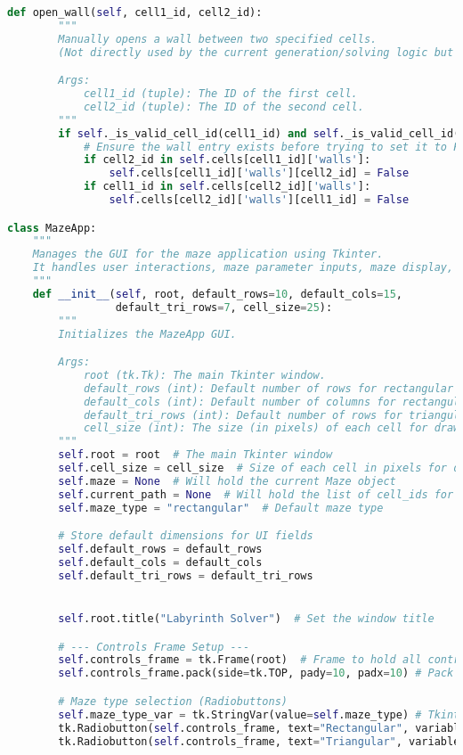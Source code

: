 \documentclass[UTF8]{report}
\theoremstyle{MyLineTheoremStyle} %
\theoremstyle{MyBlockTheoremStyle} %
\theoremstyle{MySubsubsectionStyle} %
\begin{document}
\begin{lstlisting}[language=Python, caption={迷宫生成与求解程序代码}]
    def open_wall(self, cell1_id, cell2_id):
        """
        Manually opens a wall between two specified cells.
        (Not directly used by the current generation/solving logic but can be a utility).

        Args:
            cell1_id (tuple): The ID of the first cell.
            cell2_id (tuple): The ID of the second cell.
        """
        if self._is_valid_cell_id(cell1_id) and self._is_valid_cell_id(cell2_id):
            # Ensure the wall entry exists before trying to set it to False
            if cell2_id in self.cells[cell1_id]['walls']:
                self.cells[cell1_id]['walls'][cell2_id] = False
            if cell1_id in self.cells[cell2_id]['walls']: 
                self.cells[cell2_id]['walls'][cell1_id] = False

class MazeApp:
    """
    Manages the GUI for the maze application using Tkinter.
    It handles user interactions, maze parameter inputs, maze display, and path visualization.
    """
    def __init__(self, root, default_rows=10, default_cols=15, 
                 default_tri_rows=7, cell_size=25): 
        """
        Initializes the MazeApp GUI.

        Args:
            root (tk.Tk): The main Tkinter window.
            default_rows (int): Default number of rows for rectangular mazes.
            default_cols (int): Default number of columns for rectangular mazes.
            default_tri_rows (int): Default number of rows for triangular mazes.
            cell_size (int): The size (in pixels) of each cell for drawing.
        """
        self.root = root  # The main Tkinter window
        self.cell_size = cell_size  # Size of each cell in pixels for drawing
        self.maze = None  # Will hold the current Maze object
        self.current_path = None  # Will hold the list of cell_ids for the solved path
        self.maze_type = "rectangular"  # Default maze type

        # Store default dimensions for UI fields
        self.default_rows = default_rows
        self.default_cols = default_cols
        self.default_tri_rows = default_tri_rows 


        self.root.title("Labyrinth Solver")  # Set the window title

        # --- Controls Frame Setup ---
        self.controls_frame = tk.Frame(root)  # Frame to hold all control widgets
        self.controls_frame.pack(side=tk.TOP, pady=10, padx=10) # Pack it at the top

        # Maze type selection (Radiobuttons)
        self.maze_type_var = tk.StringVar(value=self.maze_type) # Tkinter string variable for radiobuttons
        tk.Radiobutton(self.controls_frame, text="Rectangular", variable=self.maze_type_var, value="rectangular", command=self.on_maze_type_change).grid(row=0, column=0)
        tk.Radiobutton(self.controls_frame, text="Triangular", variable=self.maze_type_var, value="triangular", command=self.on_maze_type_change).grid(row=0, column=1) # Adjusted column


\end{lstlisting}
\end{document}
